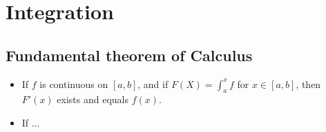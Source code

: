 \section{Integration}

\subsection{Fundamental theorem of Calculus}
\begin{itemize}
\item
	If $f$ is continuous on $[a, b]$, and if $F(X)=\int_a^x f$
	for $x\in[a,b]$, then $F'(x)$ exists and equals $f(x)$.
\item
	If ...
\end{itemize}



